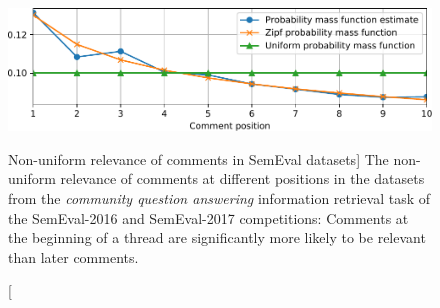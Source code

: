 \begin{figure}
\includegraphics{godwins-law}
\vspace{-0.6cm}
\caption
  [Non-uniform relevance of comments in SemEval datasets]%
  {The non-uniform relevance of comments at different positions in the datasets
   from the \emph{community question answering} information retrieval task of
   the SemEval-2016 and SemEval-2017 competitions: Comments at the beginning of
   a thread are significantly more likely to be relevant than later comments.
   \cite[Figure 2]{novotny2018weighting}}
\label{fig:weighted-zone-scoring}
\end{figure}
